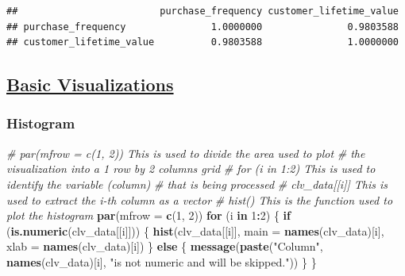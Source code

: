 \documentclass[
]{article}
\newenvironment{Shaded}{\begin{snugshade}}{\end{snugshade}}
\newcommand{\AttributeTok}[1]{\textcolor[rgb]{0.13,0.29,0.53}{#1}}
\newcommand{\CommentTok}[1]{\textcolor[rgb]{0.56,0.35,0.01}{\textit{#1}}}
\newcommand{\ControlFlowTok}[1]{\textcolor[rgb]{0.13,0.29,0.53}{\textbf{#1}}}
\newcommand{\DecValTok}[1]{\textcolor[rgb]{0.00,0.00,0.81}{#1}}
\newcommand{\FunctionTok}[1]{\textcolor[rgb]{0.13,0.29,0.53}{\textbf{#1}}}
\newcommand{\NormalTok}[1]{#1}
\newcommand{\SpecialCharTok}[1]{\textcolor[rgb]{0.81,0.36,0.00}{\textbf{#1}}}
\newcommand{\StringTok}[1]{\textcolor[rgb]{0.31,0.60,0.02}{#1}}
\begin{document}
\begin{verbatim}
##                         purchase_frequency customer_lifetime_value
## purchase_frequency               1.0000000               0.9803588
## customer_lifetime_value          0.9803588               1.0000000
\end{verbatim}

\subsection{\texorpdfstring{\ul{\textbf{Basic
Visualizations}}}{Basic Visualizations}}\label{basic-visualizations}

\subsubsection{\texorpdfstring{\textbf{Histogram}}{Histogram}}\label{histogram}

\begin{Shaded}
\begin{Highlighting}[]
\CommentTok{\# \textasciigrave{}par(mfrow = c(1, 2))\textasciigrave{} This is used to divide the area used to plot}
\CommentTok{\# the visualization into a 1 row by 2 columns grid}
\CommentTok{\# \textasciigrave{}for (i in 1:2)\textasciigrave{} This is used to identify the variable (column) }
\CommentTok{\# that is being processed}
\CommentTok{\# \textasciigrave{}clv\_data[[i]]\textasciigrave{} This is used to extract the i{-}th column as a vector}
\CommentTok{\# \textasciigrave{}hist()\textasciigrave{} This is the function used to plot the histogram}
\FunctionTok{par}\NormalTok{(}\AttributeTok{mfrow =} \FunctionTok{c}\NormalTok{(}\DecValTok{1}\NormalTok{, }\DecValTok{2}\NormalTok{))}
\ControlFlowTok{for}\NormalTok{ (i }\ControlFlowTok{in} \DecValTok{1}\SpecialCharTok{:}\DecValTok{2}\NormalTok{) \{}
  \ControlFlowTok{if}\NormalTok{ (}\FunctionTok{is.numeric}\NormalTok{(clv\_data[[i]])) \{}
    \FunctionTok{hist}\NormalTok{(clv\_data[[i]],}
         \AttributeTok{main =} \FunctionTok{names}\NormalTok{(clv\_data)[i],}
         \AttributeTok{xlab =} \FunctionTok{names}\NormalTok{(clv\_data)[i])}
\NormalTok{  \} }\ControlFlowTok{else}\NormalTok{ \{}
    \FunctionTok{message}\NormalTok{(}\FunctionTok{paste}\NormalTok{(}\StringTok{"Column"}\NormalTok{, }\FunctionTok{names}\NormalTok{(clv\_data)[i],}
                  \StringTok{"is not numeric and will be skipped."}\NormalTok{))}
\NormalTok{  \}}
\NormalTok{\}}
\end{Highlighting}
\end{Shaded}
\end{document}
